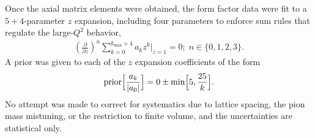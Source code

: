 Once the axial matrix elements were obtained,
 the form factor data were fit to a $5+4$-parameter $z$ expansion,
 including four parameters to enforce sum rules that regulate the large-$Q^2$ behavior,
\begin{align}
 \left( \frac{\partial}{\partial z} \right)^n
 \sum_{k=0}^{k_{\text{max}}+4} a_k z^k \Big|_{z=1} = 0; \; n \in \{0,1,2,3\}.
\end{align}
A prior was given to each of the $z$ expansion coefficients of the form
\begin{align}
 {\rm prior}\Big[ \frac{a_k}{|a_0|} \Big] = 0 \pm {\rm min} \Big[ 5, \frac{25}{k} \Big].
\end{align}
No attempt was made to correct for systematics due to lattice spacing,
 the pion mass mistuning, or the restriction to finite volume,
 and the uncertainties are statistical only.

